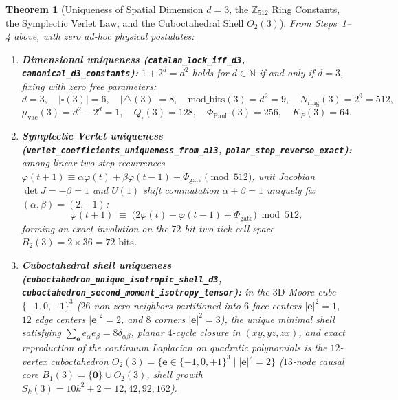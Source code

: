 \documentclass[11pt,a4paper]{article}
\theoremstyle{plain}
\newtheorem{theorem}{Theorem}[section]
\theoremstyle{definition}
\begin{document}
\begin{theorem}[Uniqueness of Spatial Dimension $d=3$, the $\mathbb{Z}_{512}$ Ring Constants, the Symplectic Verlet Law, and the Cuboctahedral Shell $O_2(3)$]
\label{thm:d3-verlet-cuboct}
From Steps~1--4 above, with zero ad-hoc physical postulates:
\begin{enumerate}[label=\textbf{(\roman*)},leftmargin=*]
\item \textbf{Dimensional uniqueness (\texttt{catalan\_lock\_iff\_d3}, \texttt{canonical\_d3\_constants}):}
  $1 + 2^d = d^2$ holds for $d\in\mathbb{N}$ if and only if $d = 3$, fixing with zero free parameters:
  \[
    d = 3,\quad |\square(3)| = 6,\quad |{\triangle}(3)| = 8,\quad \mathrm{mod\_bits}(3) = d^2 = 9,\quad N_{\mathrm{ring}}(3) = 2^9 = 512,
  \]
  \[
    \mu_{\mathrm{vac}}(3) = d^2 - 2^d = 1,\quad Q_\square(3) = 128,\quad \Phi_{\mathrm{Pauli}}(3) = 256,\quad K_P(3) = 64.
  \]
\item \textbf{Symplectic Verlet uniqueness (\texttt{verlet\_coefficients\_uniqueness\_from\_a13}, \texttt{polar\_step\_reverse\_exact}):}
  among linear two-step recurrences $\varphi(t+1)\equiv \alpha\varphi(t)+\beta\varphi(t-1)+\Phi_{\mathrm{gate}}\pmod{512}$, unit Jacobian $\det J = -\beta = 1$ and $U(1)$ shift commutation $\alpha+\beta = 1$ uniquely fix $(\alpha,\beta) = (2,-1)$:
  \begin{equation}
    \label{eq:verlet-law}
    \varphi(t+1) \;\equiv\; \bigl(2\varphi(t) - \varphi(t-1) + \Phi_{\mathrm{gate}}\bigr) \bmod 512,
  \end{equation}
  forming an exact involution on the $72$-bit two-tick cell space $B_2(3) = 2\times 36 = 72\text{ bits}$.
\item \textbf{Cuboctahedral shell uniqueness (\texttt{cuboctahedron\_unique\_isotropic\_shell\_d3}, \texttt{cuboctahedron\_second\_moment\_isotropy\_tensor}):}
  in the $3\mathrm{D}$ Moore cube $\{-1,0,+1\}^3$ ($26$ non-zero neighbors partitioned into $6$ face centers $|\mathbf{e}|^2=1$, $12$ edge centers $|\mathbf{e}|^2=2$, and $8$ corners $|\mathbf{e}|^2=3$), the unique minimal shell satisfying $\sum_{\mathbf{e}} e_\alpha e_\beta = 8\delta_{\alpha\beta}$, planar $4$-cycle closure in $(xy,yz,zx)$, and exact reproduction of the continuum Laplacian on quadratic polynomials is the $12$-vertex cuboctahedron $O_2(3) = \{\mathbf{e}\in\{-1,0,+1\}^3\mid |\mathbf{e}|^2 = 2\}$ ($13$-node causal core $B_1(3) = \{\mathbf{0}\}\cup O_2(3)$, shell growth $S_k(3) = 10k^2 + 2 = 12,42,92,162$).
\end{enumerate}
\end{theorem}
\end{document}

